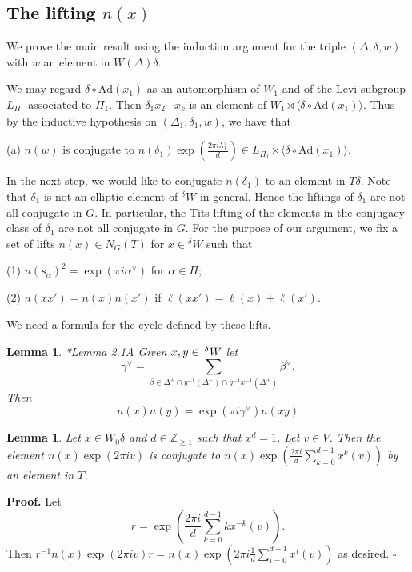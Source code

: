 \documentclass[10pt,leqno]{article}
\newtheorem{lemma}[equation]{Lemma}
\newcommand{\qed}{\hfill $\square$ \medskip}
\newenvironment{proof}[1][Proof]{\noindent\textbf{#1.} }{\qed}
\newcommand{\Ad}{\text{Ad}}
\renewcommand{\a}{\mathfrak a}
\newcommand{\Wext}{\negthinspace\negthinspace\phantom{a}^\delta W}
\def\ge{\geqslant}
\def\a{\alpha}
\def\b{\beta}
\def\d{\delta}
\def\l{\lambda}
\def\i{^{-1}}
\begin{document}
\subsection{The lifting $n(x)$}\label{setup}

We prove the main result using the induction argument for the triple $(\Delta, \d, w)$ with $w$ an element in $W(\Delta) \d$. 

We may regard $\delta\circ\Ad(x_1)$ as an automorphism of $W_1$ and of
the Levi subgroup $L_{\Pi_1}$ associated to $\Pi_1$. Then
$\d_1 x_2 \cdots x_k$ is an element of
$W_1 \rtimes \langle\d \circ \Ad(x_1)\rangle$. Thus by the inductive
hypothesis on $(\Delta_1, \d_1, w)$, we have that

(a) $n(w)$ is conjugate to $n(\d_1) \exp(\frac{2 \pi i \l^\vee_1}{d}) \in L_{\Pi_1} \rtimes \langle\d \circ \Ad(x_1)\rangle$.

In the next step, we would like to conjugate $n(\d_1)$ to an element
in $T \d$. Note that $\d_1$ is not an elliptic element of ${}^\d W$ in
general.  Hence the liftings of $\d_1$ are not all conjugate in
$G$. In particular, the Tits lifting of the elements in the conjugacy
class of $\d_1$ are not all conjugate in $G$. For the purpose of our
argument, we fix a set of lifts $n(x) \in N_G(T)$ for $x \in {}^\d W$
such that

(1) $n(s_\a)^2=\exp(\pi i \a^\vee)$ for $\a \in \Pi$;

(2) $n(x x') = n(x) n(x')$ if $\ell(x x') = \ell(x) + \ell(x')$.

We need a formula for the cycle defined by these lifts.

\begin{lemma} \label{factor}{\cite{ls}*{Lemma 2.1A}}
Given $x,y\in \Wext$ let
$$
\gamma^\vee=\sum_{\b \in \Delta^+ \cap y \i(\Delta^-) \cap y \i x \i (\Delta^+)} \b^\vee.
$$
Then
$$
n(x)n(y)=\exp(\pi i\gamma^\vee) n(xy)
$$
\end{lemma}


\begin{lemma} \label{average}
  Let $x \in W_0 \d$ and  $d \in \mathbb Z_{\ge 1}$ such that $x^d=1$. Let $v\in V$. Then the element $n(x)\exp(2 \pi i v)$ is conjugate to
  $n(x) \exp(\frac{2 \pi i}{d}\sum_{k=0}^{d-1} x^k(v))$ by an element in $T$.
\end{lemma}
\begin{proof}
Let
$$
r=\exp(\frac{2\pi i }{d}\sum_{k=0}^{d-1} k x^{-k}(v)).
$$
Then $r^{-1} n(x)\exp(2 \pi i v) r = n(x) \exp(2\pi i\frac{1}{d}\sum_{i=0}^{d-1} x^i(v))$ as desired.
\end{proof}
\end{document}
